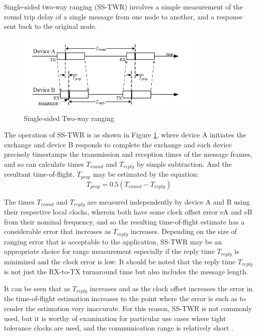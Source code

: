 Single-sided two-way ranging (SS-TWR) involves a simple measurement of the round trip delay of a single message from one node to another, and a response sent back to the original node. 

\begin{figure}[h!]
    \includegraphics[width=0.8\textwidth]{figures/SSTWR.png}
    \centering
    \caption[Single-sided Two-way ranging]{Single-sided Two-way ranging \protect\cite{DW1000UserManual}}
    \label{fig:Single-sided Two-way ranging}    
\end{figure}

The operation of SS-TWR is as shown in Figure \ref{fig:Single-sided Two-way ranging}, where device A initiates the exchange and device B responds to complete the exchange and each device precisely timestamps the transmission and reception times of the message frames, and so can calculate times $T_{round}$ and $T_{reply}$ by simple subtraction.  And the resultant time-of-flight, $T_{prop}$ may be estimated by the equation:  
\begin{equation}
 T_{prop} = 0.5 (T_{round} - T_{reply})
\end{equation}

The times $T_{round}$ and $T_{reply}$ are measured independently by device A and B using their respective local clocks, wherein both have some clock offset error eA and eB from their nominal frequency, and so the resulting time-of-flight estimate has a considerable error that increases as $T_{reply}$ increases.  Depending on the size of ranging error that is acceptable to the application, SS-TWR may be an appropriate choice for range measurement especially if the reply time $T_{reply}$ is minimized and the clock error is low.  It should be noted that the reply time $T_{reply}$ is not just the RX-to-TX turnaround time but also includes the message length. 

It can be seen that as $T_{reply}$ increases and as the clock offset increases the error in the time-of-flight estimation increases to the point where the error is such as to render the estimation very inaccurate.  For this reason, SS-TWR is not commonly used, but it is worthy of examination for particular use cases where tight tolerance clocks are used, and the communication range is relatively short \cite{gutierrez2004low}.

